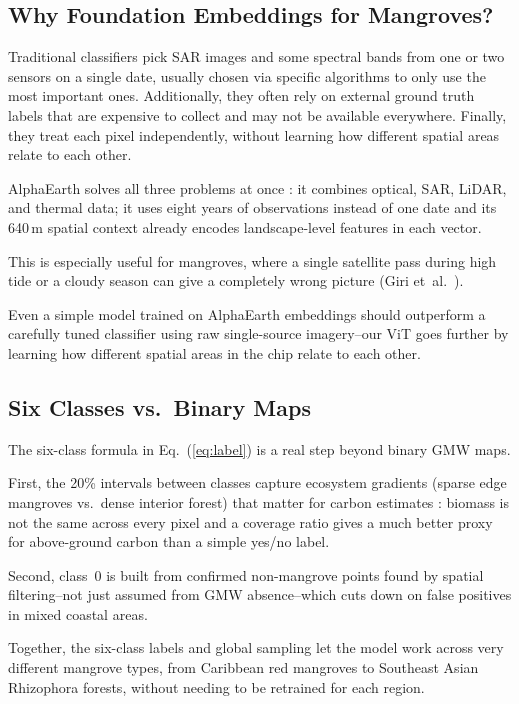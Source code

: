 \documentclass[conference,a4paper]{IEEEtran}
\begin{document}
\subsection{Why Foundation Embeddings for Mangroves?}

Traditional classifiers pick SAR images and some spectral bands from one or two sensors on a single date, 
usually chosen via specific algorithms to only use the most important ones.
Additionally, they often rely on external ground truth labels that are expensive to collect and may not be available everywhere.
Finally, they treat each pixel independently, 
without learning how different spatial areas relate to each other. 

AlphaEarth solves all three problems at once : it combines optical, SAR, LiDAR, and thermal data; 
it uses eight years of observations instead of one date 
and its 640\,m spatial context already encodes landscape-level features in each vector. 

This is especially useful for mangroves, 
where a single satellite pass during high tide or a cloudy season can give a completely wrong picture (Giri et~al.~\cite{article4}). 

Even a simple model trained on AlphaEarth embeddings should outperform a carefully tuned classifier using raw single-source imagery--our ViT goes further by learning how different spatial areas in the chip relate to each other.

\subsection{Six Classes vs.\ Binary Maps}

The six-class formula in Eq.~(\ref{eq:label}) is a real step beyond binary GMW maps. 

First, the 20\% intervals between classes capture ecosystem gradients (sparse edge mangroves vs.\ dense interior forest) that matter for carbon estimates : biomass is not the same across every pixel 
and a coverage ratio gives a much better proxy for above-ground carbon than a simple yes/no label. 

Second, class~0 is built from confirmed non-mangrove points found by spatial filtering--not just assumed from GMW absence--which cuts down on false positives in mixed coastal areas. 

Together, the six-class labels and global sampling let the model work across very different mangrove types, 
from Caribbean red mangroves to Southeast Asian Rhizophora forests, 
without needing to be retrained for each region.
\end{document}
